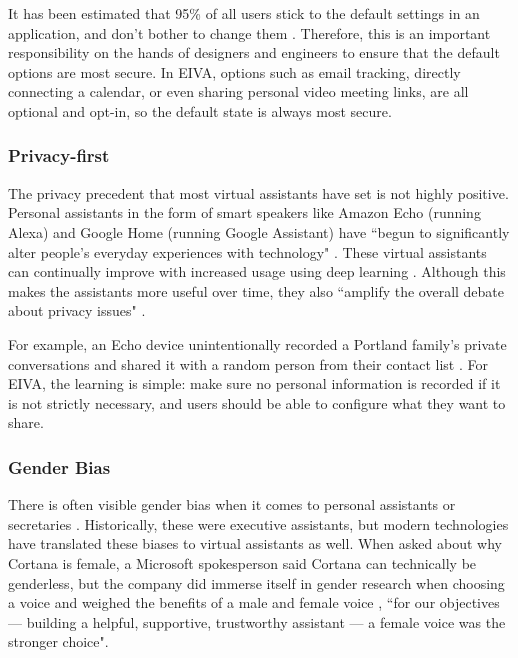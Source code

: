 \documentclass{article}
\begin{document}
It has been estimated that 95\% of all users stick to the default settings in an application, and don't bother to change them \cite{catalanotto_95_2019}. Therefore, this is an important responsibility on the hands of designers and engineers to ensure that the default options are most secure. In EIVA, options such as email tracking, directly connecting a calendar, or even sharing personal video meeting links, are all optional and opt-in, so the default state is always most secure.

\subsubsection{Privacy-first}

The privacy precedent that most virtual assistants have set is not highly positive. Personal assistants in the form of smart speakers like Amazon Echo (running Alexa) and Google Home (running Google Assistant) have ``begun to significantly alter people’s everyday experiences with technology" \cite{pridmore_personal_2020}. These virtual assistants can continually improve with increased usage using deep learning \cite{kepuska_next-generation_2018}. Although this makes the assistants more useful over time, they also ``amplify the overall debate about privacy issues" \cite{zeng_end_2017}.

For example, an Echo device unintentionally recorded a Portland family's private conversations and shared it with a random person from their contact list \cite{noauthor_this_nodate-1}. For EIVA, the learning is simple: make sure no personal information is recorded if it is not strictly necessary, and users should be able to configure what they want to share.

\subsubsection{Gender Bias}

There is often visible gender bias when it comes to personal assistants or secretaries \cite{noauthor_why_2018}. Historically, these were executive assistants, but modern technologies have translated these biases to virtual assistants as well. When asked about why Cortana is female, a Microsoft spokesperson said Cortana can technically be genderless, but the company did immerse itself in gender research when choosing a voice and weighed the benefits of a male and female voice \cite{pcmag_real_2018}, ``for our objectives — building a helpful, supportive, trustworthy assistant — a female voice was the stronger choice".
\end{document}
